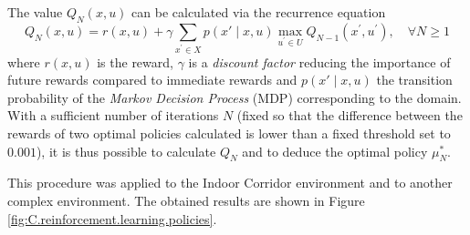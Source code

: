 The value $Q_N(x, u)$ can be calculated via the recurrence equation
\begin{equation}
    Q_{N}(x, u) = r(x, u) + \gamma \sum_{x^{\prime} \in X} p(x' \mid x, u) \max_{u^{\prime} \in U} Q_{N-1}\left(x^{\prime}, u^{\prime}\right), \quad \forall N \geq 1
\end{equation}
where $r(x, u)$ is the reward, $\gamma$ is a \emph{discount factor} reducing the importance of future rewards compared to immediate rewards and $p(x' \mid x, u)$ the transition probability of the \emph{Markov Decision Process} (MDP) corresponding to the domain. With a sufficient number of iterations $N$ (fixed so that the difference between the rewards of two optimal policies calculated is lower than a fixed threshold set to $\num{0.001}$), it is thus possible to calculate $Q_N$ and to deduce the optimal policy $\mu^*_N$.

This procedure was applied to the Indoor Corridor environment and to another complex environment. The obtained results are shown in Figure \ref{fig:C.reinforcement.learning.policies}.

